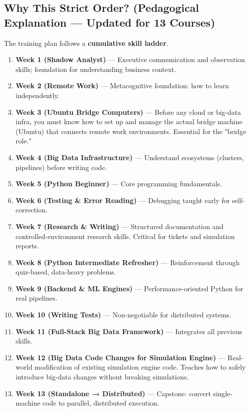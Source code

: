 \documentclass[12pt]{article}
\begin{document}
	\subsection*{Why This Strict Order? (Pedagogical Explanation — Updated for 13 Courses)}
	
	The training plan follows a \textbf{cumulative skill ladder}.
	
	\begin{enumerate}
		\item \textbf{Week 1 (Shadow Analyst)} — Executive communication and observation skills; foundation for understanding business context.
		
		\item \textbf{Week 2 (Remote Work)} — Metacognitive foundation: how to learn independently.
		
		\item \textbf{Week 3 (Ubuntu Bridge Computers)} — Before any cloud or big-data infra, you must know how to set up and manage the actual bridge machine (Ubuntu) that connects remote work environments. Essential for the "bridge role."
		
		\item \textbf{Week 4 (Big Data Infrastructure)} — Understand ecosystems (clusters, pipelines) before writing code.
		
		\item \textbf{Week 5 (Python Beginner)} — Core programming fundamentals.
		
		\item \textbf{Week 6 (Testing \& Error Reading)} — Debugging taught early for self-correction.
		
		\item \textbf{Week 7 (Research \& Writing)} — Structured documentation and controlled-environment research skills. Critical for tickets and simulation reports.
		
		\item \textbf{Week 8 (Python Intermediate Refresher)} — Reinforcement through quiz-based, data-heavy problems.
		
		\item \textbf{Week 9 (Backend \& ML Engines)} — Performance-oriented Python for real pipelines.
		
		\item \textbf{Week 10 (Writing Tests)} — Non-negotiable for distributed systems.
		
		\item \textbf{Week 11 (Full-Stack Big Data Framework)} — Integrates all previous skills.
		
		\item \textbf{Week 12 (Big Data Code Changes for Simulation Engine)} — Real-world modification of existing simulation engine code. Teaches how to safely introduce big-data changes without breaking simulations.
		
		\item \textbf{Week 13 (Standalone → Distributed)} — Capstone: convert single-machine code to parallel, distributed execution.
	\end{enumerate}
	
\end{document}
